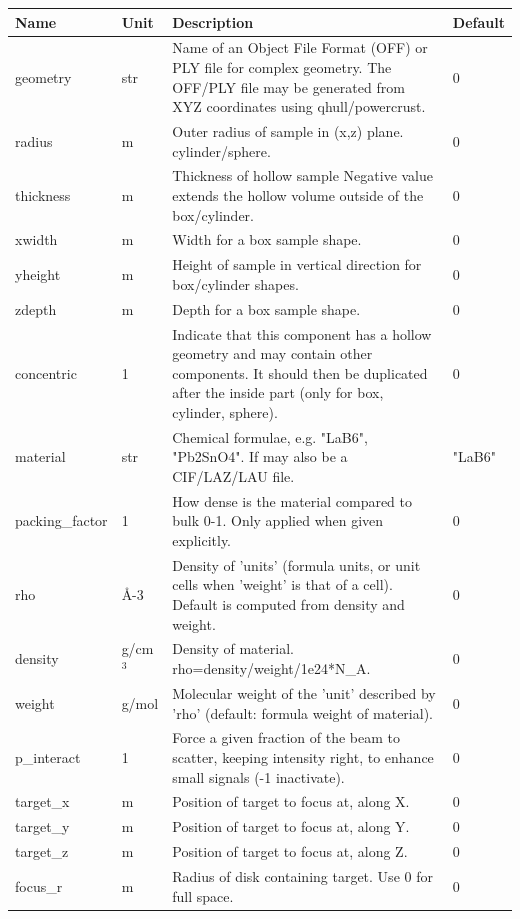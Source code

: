 \begin{longtable}{p{}p{}p{}p{}}
\toprule
\textbf{Name} & \textbf{Unit} & \textbf{Description} & \textbf{Default} \\
\midrule
\endhead
geometry & str & Name of an Object File Format (OFF) or PLY file for complex geometry. The OFF/PLY file may be generated from XYZ coordinates using qhull/powercrust. & 0 \\
radius & m & Outer radius of sample in (x,z) plane. cylinder/sphere. & 0 \\
thickness & m & Thickness of hollow sample Negative value extends the hollow volume outside of the box/cylinder. & 0 \\
xwidth & m & Width for a box sample shape. & 0 \\
yheight & m & Height of sample in vertical direction for box/cylinder shapes. & 0 \\
zdepth & m & Depth for a box sample shape. & 0 \\
concentric & 1 & Indicate that this component has a hollow geometry and may contain other components. It should then be duplicated after the inside part (only for box, cylinder, sphere). & 0 \\
material & str & Chemical formulae, e.g. "LaB6", "Pb2SnO4". If may also be a CIF/LAZ/LAU file. & "LaB6" \\
packing\_factor & 1 & How dense is the material compared to bulk 0-1. Only applied when given explicitly. & 0 \\
rho & \AA{}-3 & Density of 'units' (formula units, or unit cells when 'weight' is that of a cell). Default is computed from density and weight. & 0 \\
density & g/cm$^{3}$ & Density of material. rho=density/weight/1e24*N\_A. & 0 \\
weight & g/mol & Molecular weight of the 'unit' described by 'rho' (default: formula weight of material). & 0 \\
p\_interact & 1 & Force a given fraction of the beam to scatter, keeping intensity right, to enhance small signals (-1 inactivate). & 0 \\
target\_x & m & Position of target to focus at, along X. & 0 \\
target\_y & m & Position of target to focus at, along Y. & 0 \\
target\_z & m & Position of target to focus at, along Z. & 0 \\
focus\_r & m & Radius of disk containing target. Use 0 for full space. & 0 \\

\end{longtable}
